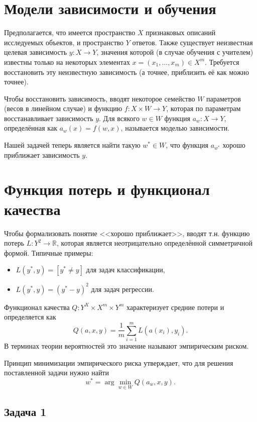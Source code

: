 \section{Модели зависимости и обучения}

Предполагается, что имеется пространство $X$ признаковых описаний исследуемых объектов, и пространство $Y$ ответов.
Также существует неизвестная целевая зависимость $y\colon X\to Y$, значения которой (в случае обучения с учителем) известны только на некоторых элементах $x = (x_1, \ldots, x_m) \in X^m$.
Требуется восстановить эту неизвестную зависимость (а точнее, приблизить её как можно точнее).

Чтобы восстановить зависимость, вводят некоторое семейство $W$ параметров (весов в линейном случае) и функцию \( f\colon X\times W\to Y\), которая по параметрам восстанавливает зависимость $y$. 
Для всякого \( w\in W\) функция \( a_w\colon X\to Y\), определённая как \( a_w(x) = f(w, x)\), называется моделью зависимости.

Нашей задачей теперь является найти такую $w^* \in W$, что функция \( a_{w^*}\) хорошо приближает зависимость $y$.

\section{Функция потерь и функционал качества}

Чтобы формализовать понятие <<хорошо приближает>>, вводят т.н. функцию потерь \( L\colon Y^2\to \mathbb{R} \), которая является неотрицательно определённой симметричной формой. Типичные примеры:
\begin{itemize}
    \item \(L(y^*, y) = [y^*\neq y]\) для задач классификации,

    \item \(L(y^*, y) = (y^* - y)^2\) для задач регрессии.
\end{itemize}

Функционал качества \( Q \colon Y^X \times X^m \times Y^m\) характеризует средние потери и определяется как
\[
    Q(a, x, y) = \frac{1}{m} \sum_{i=1}^m L(a(x_i), y_i).
\]
В терминах теории вероятностей это значение называют эмпирическим риском.

Принцип минимизации эмпирического риска утверждает, что для решения поставленной задачи нужно найти
\[
    w^* = \arg\min_{w\in W} Q(a_w, x, y).
\]

\subsection*{Задача 1}


